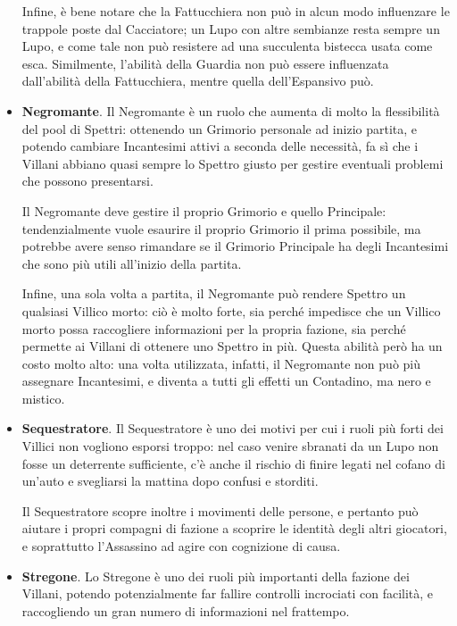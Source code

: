 \documentclass[a4paper,10pt]{article}
\begin{document}
\begin{itemize}
    Infine, è bene notare che la Fattucchiera non può in alcun modo influenzare le trappole poste dal Cacciatore; un Lupo con altre sembianze resta sempre un Lupo, e come tale non può resistere ad una succulenta bistecca usata come esca. Similmente, l'abilità della Guardia non può essere influenzata dall'abilità della Fattucchiera, mentre quella dell'Espansivo può.
	
	\item {\bf Negromante}. Il Negromante è un ruolo che aumenta di molto la flessibilità del pool di Spettri: ottenendo un Grimorio personale ad inizio partita, e potendo cambiare Incantesimi attivi a seconda delle necessità, fa sì che i Villani abbiano quasi sempre lo Spettro giusto per gestire eventuali problemi che possono presentarsi.
	
	Il Negromante deve gestire il proprio Grimorio e quello Principale: tendenzialmente vuole esaurire il proprio Grimorio il prima possibile, ma potrebbe avere senso rimandare se il Grimorio Principale ha degli Incantesimi che sono più utili all'inizio della partita.
	
	Infine, una sola volta a partita, il Negromante può rendere Spettro un qualsiasi Villico morto: ciò è molto forte, sia perché impedisce che un Villico morto possa raccogliere informazioni per la propria fazione, sia perché permette ai Villani di ottenere uno Spettro in più. Questa abilità però ha un costo molto alto: una volta utilizzata, infatti, il Negromante non può più assegnare Incantesimi, e diventa a tutti gli effetti un Contadino, ma nero e mistico.
	
	\item {\bf Sequestratore}. Il Sequestratore è uno dei motivi per cui i ruoli più forti dei Villici non vogliono esporsi troppo: nel caso venire sbranati da un Lupo non fosse un deterrente sufficiente, c'è anche il rischio di finire legati nel cofano di un'auto e svegliarsi la mattina dopo confusi e storditi.
	
	Il Sequestratore scopre inoltre i movimenti delle persone, e pertanto può aiutare i propri compagni di fazione a scoprire le identità degli altri giocatori, e soprattutto l'Assassino ad agire con cognizione di causa.
	
	\item {\bf Stregone}. Lo Stregone è uno dei ruoli più importanti della fazione dei Villani, potendo potenzialmente far fallire controlli incrociati con facilità, e raccogliendo un gran numero di informazioni nel frattempo. 
	

\end{itemize}
\end{document}
